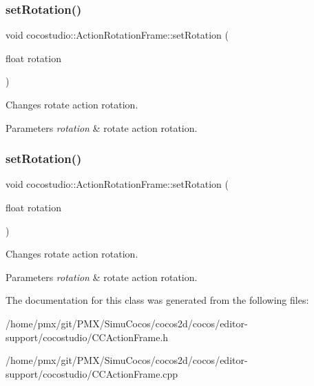 \subsubsection{\texorpdfstring{set\+Rotation()}{setRotation()}\hspace{0.1cm}{\footnotesize\ttfamily [1/2]}}
{\footnotesize\ttfamily void cocostudio\+::\+Action\+Rotation\+Frame\+::set\+Rotation (\begin{DoxyParamCaption}\item[{float}]{rotation }\end{DoxyParamCaption})}

Changes rotate action rotation.


\begin{DoxyParams}{Parameters}
{\em rotation} & rotate action rotation. \\
\hline
\end{DoxyParams}
\mbox{\label{classcocostudio_1_1ActionRotationFrame_adc0bf018e56a6cb589164b3db1cf6da0}} 
\subsubsection{\texorpdfstring{set\+Rotation()}{setRotation()}\hspace{0.1cm}{\footnotesize\ttfamily [2/2]}}
{\footnotesize\ttfamily void cocostudio\+::\+Action\+Rotation\+Frame\+::set\+Rotation (\begin{DoxyParamCaption}\item[{float}]{rotation }\end{DoxyParamCaption})}

Changes rotate action rotation.


\begin{DoxyParams}{Parameters}
{\em rotation} & rotate action rotation. \\
\hline
\end{DoxyParams}


The documentation for this class was generated from the following files\+:\begin{DoxyCompactItemize}
\item 
/home/pmx/git/\+P\+M\+X/\+Simu\+Cocos/cocos2d/cocos/editor-\/support/cocostudio/C\+C\+Action\+Frame.\+h\item 
/home/pmx/git/\+P\+M\+X/\+Simu\+Cocos/cocos2d/cocos/editor-\/support/cocostudio/C\+C\+Action\+Frame.\+cpp\end{DoxyCompactItemize}
